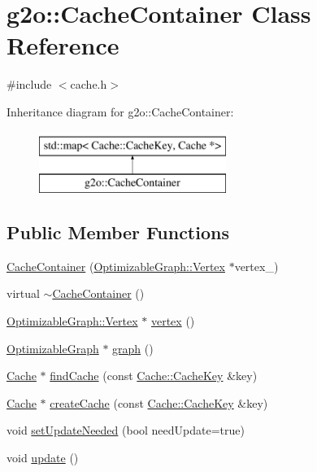 \hypertarget{classg2o_1_1_cache_container}{}\section{g2o\+:\+:Cache\+Container Class Reference}
\label{classg2o_1_1_cache_container}


{\ttfamily \#include $<$cache.\+h$>$}

Inheritance diagram for g2o\+:\+:Cache\+Container\+:\begin{figure}[H]
\begin{center}
\leavevmode
\includegraphics[height=2.000000cm]{classg2o_1_1_cache_container}
\end{center}
\end{figure}
\subsection*{Public Member Functions}
\begin{DoxyCompactItemize}
\item 
\mbox{\hyperlink{classg2o_1_1_cache_container_aed510932f7e499f2fd3c1fdea7809052}{Cache\+Container}} (\mbox{\hyperlink{classg2o_1_1_optimizable_graph_1_1_vertex}{Optimizable\+Graph\+::\+Vertex}} $\ast$vertex\+\_\+)
\item 
virtual \mbox{\hyperlink{classg2o_1_1_cache_container_a2eb9f659371a1af2c119fce3e2972e52}{$\sim$\+Cache\+Container}} ()
\item 
\mbox{\hyperlink{classg2o_1_1_optimizable_graph_1_1_vertex}{Optimizable\+Graph\+::\+Vertex}} $\ast$ \mbox{\hyperlink{classg2o_1_1_cache_container_ada4f7f82992a85dbc742c1ab24c39c08}{vertex}} ()
\item 
\mbox{\hyperlink{structg2o_1_1_optimizable_graph}{Optimizable\+Graph}} $\ast$ \mbox{\hyperlink{classg2o_1_1_cache_container_a4bf79d27bb9ae377446dfa7fd048b06d}{graph}} ()
\item 
\mbox{\hyperlink{classg2o_1_1_cache}{Cache}} $\ast$ \mbox{\hyperlink{classg2o_1_1_cache_container_a2a0230117e0e71210f3d10a9e7143d0f}{find\+Cache}} (const \mbox{\hyperlink{classg2o_1_1_cache_1_1_cache_key}{Cache\+::\+Cache\+Key}} \&key)
\item 
\mbox{\hyperlink{classg2o_1_1_cache}{Cache}} $\ast$ \mbox{\hyperlink{classg2o_1_1_cache_container_a08902c228901e06c4e08c5b594683a6c}{create\+Cache}} (const \mbox{\hyperlink{classg2o_1_1_cache_1_1_cache_key}{Cache\+::\+Cache\+Key}} \&key)
\item 
void \mbox{\hyperlink{classg2o_1_1_cache_container_a2241f992e90c1078447553d0833ccf14}{set\+Update\+Needed}} (bool need\+Update=true)
\item 
void \mbox{\hyperlink{classg2o_1_1_cache_container_acc9a6d1fbc828f55b1a6af1c29f003df}{update}} ()
\end{DoxyCompactItemize}
